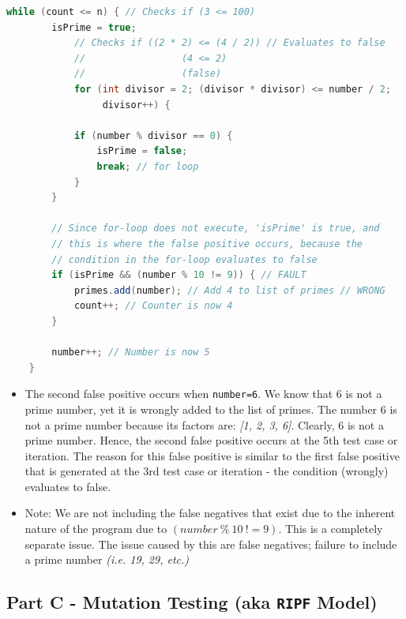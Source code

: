 \documentclass{article}
\begin{document}
\begin{enumerate}
\begin{lstlisting}[language=Java]
    while (count <= n) { // Checks if (3 <= 100)
        isPrime = true;
            // Checks if ((2 * 2) <= (4 / 2)) // Evaluates to false
            //                 (4 <= 2)
            //                 (false)
            for (int divisor = 2; (divisor * divisor) <= number / 2;
                 divisor++) {

            if (number % divisor == 0) {
                isPrime = false;
                break; // for loop
            }
        }

        // Since for-loop does not execute, 'isPrime' is true, and
        // this is where the false positive occurs, because the
        // condition in the for-loop evaluates to false
        if (isPrime && (number % 10 != 9)) { // FAULT
            primes.add(number); // Add 4 to list of primes // WRONG
            count++; // Counter is now 4
        }

        number++; // Number is now 5
    }
    \end{lstlisting}

    \end{enumerate}

\begin{itemize}

    \item The second false positive occurs when \texttt{number=6}. We know that 6 is not a prime number, yet it is wrongly added to the list of primes. The number 6 is not a prime number because its factors are: \textit{[1, 2, 3, 6]}. Clearly, 6 is not a prime number. Hence, the second false positive occurs at the 5th test case or iteration. The reason for this false positive is similar to the first false positive that is generated at the 3rd test case or iteration - the condition (wrongly) evaluates to false.

    \item Note: We are not including the false negatives that exist due to the inherent nature of the program due to $(number \ \% \ 10 \ != 9)$. This is a completely separate issue. The issue caused by this are false negatives; failure to include a prime number \textit{(i.e. 19, 29, etc.)}

\end{itemize}

\subsection*{Part C - Mutation Testing (aka \texttt{RIPF} Model)}
\end{document}
